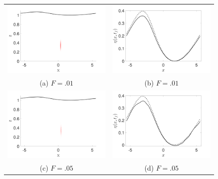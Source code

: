 \documentclass[a4paper,11pt]{article}
\begin{document}
\begin{figure}
\centering
\begin{tabular}{cc}
\includegraphics[width=.45\textwidth]{wave_over_vortices_m_pt6_w0_1} & \includegraphics[width=.45\textwidth]{profiles_m_pt6_w0_1}\\
(a)  $F=.01$ & (b)  $F=.01$\\
\includegraphics[width=.45\textwidth]{wave_over_vortices_m_pt6} & \includegraphics[width=.45\textwidth]{profiles_m_pt6}\\
(c)  $F=.05$ & (d)  $F=.05$\\

\end{tabular}
\end{figure}
\end{document}
